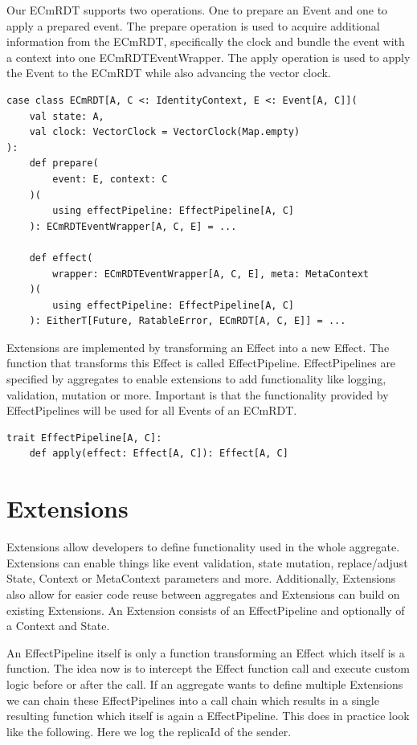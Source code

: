 \documentclass[
	ngerman,
	ruledheaders=section,   %
	class=report,		    %
	thesis={type=bachelor}, %
	accentcolor=9c,			%
	custommargins=true,    %
	marginpar=false,        %
	parskip=half-,          %
	fontsize=11pt,          %
]{tudapub}
\begin{document}
Our ECmRDT supports two operations. One to prepare an Event and one to apply a prepared event. The prepare operation is used to acquire additional information from the ECmRDT, specifically the clock and bundle the event with a context into one ECmRDTEventWrapper. The apply operation is used to apply the Event to the ECmRDT while also advancing the vector clock.

\begin{lstlisting}
case class ECmRDT[A, C <: IdentityContext, E <: Event[A, C]](
	val state: A,
	val clock: VectorClock = VectorClock(Map.empty)
):
	def prepare(
		event: E, context: C
	)(
		using effectPipeline: EffectPipeline[A, C]
	): ECmRDTEventWrapper[A, C, E] = ...

	def effect(
		wrapper: ECmRDTEventWrapper[A, C, E], meta: MetaContext
	)(
		using effectPipeline: EffectPipeline[A, C]
	): EitherT[Future, RatableError, ECmRDT[A, C, E]] = ...
\end{lstlisting}

Extensions are implemented by transforming an Effect into a new Effect. The function that transforms this Effect is called EffectPipeline. EffectPipelines are specified by aggregates to enable extensions to add functionality like logging, validation, mutation or more. Important is that the functionality provided by EffectPipelines will be used for all Events of an ECmRDT. 

\begin{lstlisting}
trait EffectPipeline[A, C]:
	def apply(effect: Effect[A, C]): Effect[A, C]
\end{lstlisting}

\section{Extensions}
Extensions allow developers to define functionality used in the whole aggregate. Extensions can enable things like event validation, state mutation, replace/adjust State, Context or MetaContext parameters and more. Additionally, Extensions also allow for easier code reuse between aggregates and Extensions can build on existing Extensions. An Extension consists of an EffectPipeline and optionally of a Context and State. 

An EffectPipeline itself is only a function transforming an Effect which itself is a function. The idea now is to intercept the Effect function call and execute custom logic before or after the call. If an aggregate wants to define multiple Extensions we can chain these EffectPipelines into a call chain which results in a single resulting function which itself is again a EffectPipeline. This does in practice look like the following. Here we log the replicaId of the sender.
\end{document}
